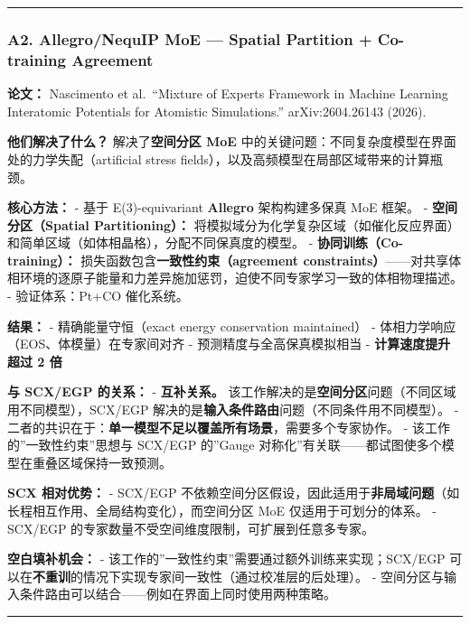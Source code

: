 \documentclass[
  12pt,
]{ctexart}
\begin{document}
\begin{center}\rule{0.5\linewidth}{0.5pt}\end{center}

\subsubsection{A2. Allegro/NequIP MoE --- Spatial Partition +
Co-training
Agreement}\label{a2.-allegronequip-moe-spatial-partition-co-training-agreement}

\textbf{论文：} Nascimento et al.~``Mixture of Experts Framework in
Machine Learning Interatomic Potentials for Atomistic Simulations.''
arXiv:2604.26143 (2026).

\textbf{他们解决了什么？} 解决了\textbf{空间分区 MoE}
中的关键问题：不同复杂度模型在界面处的力学失配（artificial stress
fields），以及高频模型在局部区域带来的计算瓶颈。

\textbf{核心方法：} - 基于 E(3)-equivariant \textbf{Allegro}
架构构建多保真 MoE 框架。 - \textbf{空间分区（Spatial Partitioning）：}
将模拟域分为化学复杂区域（如催化反应界面）和简单区域（如体相晶格），分配不同保真度的模型。
- \textbf{协同训练（Co-training）：}
损失函数包含\textbf{一致性约束（agreement
constraints）}------对共享体相环境的逐原子能量和力差异施加惩罚，迫使不同专家学习一致的体相物理描述。
- 验证体系：Pt+CO 催化系统。

\textbf{结果：} - 精确能量守恒（exact energy conservation maintained） -
体相力学响应（EOS、体模量）在专家间对齐 - 预测精度与全高保真模拟相当 -
\textbf{计算速度提升超过 2 倍}

\textbf{与 SCX/EGP 的关系：} - \textbf{互补关系。}
该工作解决的是\textbf{空间分区}问题（不同区域用不同模型），SCX/EGP
解决的是\textbf{输入条件路由}问题（不同条件用不同模型）。 -
二者的共识在于：\textbf{单一模型不足以覆盖所有场景}，需要多个专家协作。
- 该工作的''一致性约束''思想与 SCX/EGP 的''Gauge
对称化''有关联------都试图使多个模型在重叠区域保持一致预测。

\textbf{SCX 相对优势：} - SCX/EGP
不依赖空间分区假设，因此适用于\textbf{非局域问题}（如长程相互作用、全局结构变化），而空间分区
MoE 仅适用于可划分的体系。 - SCX/EGP
的专家数量不受空间维度限制，可扩展到任意多专家。

\textbf{空白填补机会：} -
该工作的''一致性约束''需要通过额外训练来实现；SCX/EGP
可以在\textbf{不重训}的情况下实现专家间一致性（通过校准层的后处理）。 -
空间分区与输入条件路由可以结合------例如在界面上同时使用两种策略。

\begin{center}\rule{0.5\linewidth}{0.5pt}\end{center}
\end{document}

